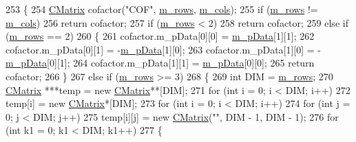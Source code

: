 \begin{DoxyCode}
253         \{
254             \hyperlink{classCMatrix}{CMatrix} cofactor(\textcolor{stringliteral}{"COF"}, \hyperlink{classCMatrix_ae23e5f8016ba06cfd1cce364a99f5037}{m\_rows}, \hyperlink{classCMatrix_a723f752208c055093012984eaddb62d3}{m\_cols});
255             \textcolor{keywordflow}{if} (\hyperlink{classCMatrix_ae23e5f8016ba06cfd1cce364a99f5037}{m\_rows} != \hyperlink{classCMatrix_a723f752208c055093012984eaddb62d3}{m\_cols})
256                 \textcolor{keywordflow}{return} cofactor;
257             \textcolor{keywordflow}{if} (\hyperlink{classCMatrix_ae23e5f8016ba06cfd1cce364a99f5037}{m\_rows} < 2)
258                 \textcolor{keywordflow}{return} cofactor;
259             \textcolor{keywordflow}{else} \textcolor{keywordflow}{if} (\hyperlink{classCMatrix_ae23e5f8016ba06cfd1cce364a99f5037}{m\_rows} == 2)
260             \{
261                 cofactor.m\_pData[0][0] = \hyperlink{classCMatrix_ab0f18d68cad9b6d750d05a96b60a759d}{m\_pData}[1][1];
262                 cofactor.m\_pData[0][1] = -\hyperlink{classCMatrix_ab0f18d68cad9b6d750d05a96b60a759d}{m\_pData}[1][0];
263                 cofactor.m\_pData[1][0] = -\hyperlink{classCMatrix_ab0f18d68cad9b6d750d05a96b60a759d}{m\_pData}[0][1];
264                 cofactor.m\_pData[1][1] = \hyperlink{classCMatrix_ab0f18d68cad9b6d750d05a96b60a759d}{m\_pData}[0][0];
265                 \textcolor{keywordflow}{return} cofactor;
266             \}
267             \textcolor{keywordflow}{else} \textcolor{keywordflow}{if} (\hyperlink{classCMatrix_ae23e5f8016ba06cfd1cce364a99f5037}{m\_rows} >= 3)
268             \{
269                 \textcolor{keywordtype}{int} DIM = \hyperlink{classCMatrix_ae23e5f8016ba06cfd1cce364a99f5037}{m\_rows};
270                 \hyperlink{classCMatrix}{CMatrix} ***temp = \textcolor{keyword}{new} \hyperlink{classCMatrix}{CMatrix}**[DIM];
271                 \textcolor{keywordflow}{for} (\textcolor{keywordtype}{int} i = 0; i < DIM; i++)
272                     temp[i] = \textcolor{keyword}{new} \hyperlink{classCMatrix}{CMatrix}*[DIM];
273                 \textcolor{keywordflow}{for} (\textcolor{keywordtype}{int} i = 0; i < DIM; i++)
274                     \textcolor{keywordflow}{for} (\textcolor{keywordtype}{int} j = 0; j < DIM; j++)
275                         temp[i][j] = \textcolor{keyword}{new} \hyperlink{classCMatrix_a720aa6a48296f4414ac7f9021bc420c4}{CMatrix}(\textcolor{stringliteral}{""}, DIM - 1, DIM - 1);
276                 \textcolor{keywordflow}{for} (\textcolor{keywordtype}{int} k1 = 0; k1 < DIM; k1++)
277                 \{

\end{DoxyCode}
